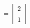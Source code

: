 \documentclass[preview]{standalone}
\begin{document}
\begin{align*}
= \begin{bmatrix} 2 \\ \\ 1 \end{bmatrix}
\end{align*}
\end{document}
